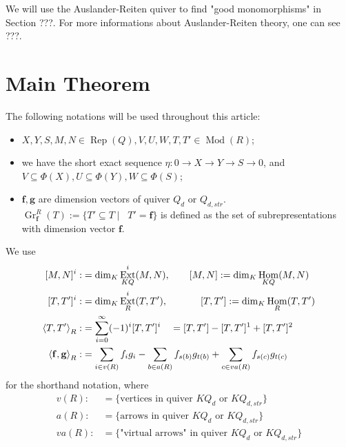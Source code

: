 \documentclass[reqno,11pt]{amsart}
\numberwithin{equation}{section}
\theoremstyle{plain}
\theoremstyle{plain}
\numberwithin{equation}{section}
\theoremstyle{remark}
\DeclareMathOperator{\Rep}{\operatorname{Rep}}
\DeclareMathOperator{\Mod}{\operatorname{Mod}}
\DeclareMathOperator{\Hom}{\operatorname{Hom}}
\DeclareMathOperator{\Ext}{\operatorname{Ext}}
\DeclareMathOperator{\dimv}{\operatorname{\underline{\mathbf{dim}}}}
\newcommand{\Grr}{\operatorname{Gr}^{R}}
\newcommand{\dimvec}[1]{\mathbf{#1}}
\begin{document}
We will use the Auslander-Reiten quiver to find "good monomorphisms" in Section ???. For more informations about Auslander-Reiten theory, one can see ???.

\section{Main Theorem}
   
   The following notations will be used throughout this article:
   \begin{itemize}
   		\item $X,Y,S,M,N \in \Rep(Q), V,U,W,T,T' \in \Mod(R)$;
   		\item we have the short exact sequence $\eta:0\longrightarrow X \longrightarrow Y \longrightarrow S \longrightarrow 0$, and $V \subseteq \Phi(X), U \subseteq \Phi(Y), W \subseteq \Phi(S)$;
   		\item $\dimvec{f},\dimvec{g}$ are dimension vectors of quiver $Q_d$ or $Q_{d,str}$. $\Grr_{\dimvec{f}}(T):= \{ T' \subseteq T \mid \dimv T'=\dimvec{f} \}$ is defined as the set of subrepresentations with dimension vector $\dimvec{f}$.
   \end{itemize}
We use 
\begin{equation*}
\begin{aligned}[]
	[M,N]^i:&=\dim_K \Ext^i_{KQ} (M,N),\qquad [M,N]:=\dim_K \Hom_{KQ} (M,N)\\
	[T,T']^i:&=\dim_K \Ext^i_R (T,T'),\qquad\hspace{0.5cm} [T,T']:=\dim_K \Hom_R (T,T')\\
	\left< T,T'\right>_R:&= \sum_{i=0}^{\infty} (-1)^i [T,T']^i \quad=[T,T']-[T,T']^1+[T,T']^2\\
	\left< \dimvec{f},\dimvec{g}\right>_R:&= \sum_{i \in v(R)} f_ig_i - \sum_{b \in a(R)} f_{s(b)}g_{t(b)}+ \sum_{c \in va(R)} f_{s(c)}g_{t(c)}
\end{aligned}
\end{equation*}
for the shorthand notation, where
\begin{equation*}
\begin{aligned}
	v(R):&= \{\text{vertices in quiver $KQ_d$ or $KQ_{d,str}$}\} \\
	a(R):&= \{\text{arrows in quiver $KQ_d$ or $KQ_{d,str}$}\} \\
	va(R):&= \{\text{"virtual arrows" in quiver $KQ_d$ or $KQ_{d,str}$}\} \\
\end{aligned}
\end{equation*}
\end{document}
